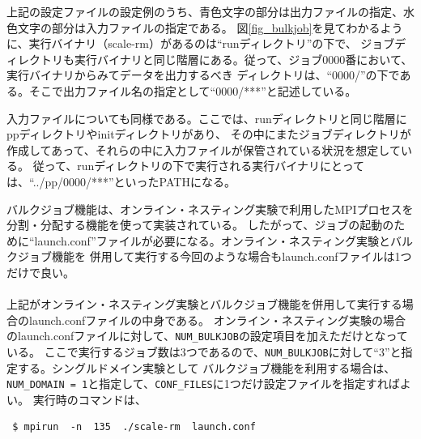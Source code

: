 \noindent 上記の設定ファイルの設定例のうち、青色文字の部分は出力ファイルの指定、水色文字の部分は入力ファイルの指定である。
図\ref{fig_bulkjob}を見てわかるように、実行バイナリ（scale-rm）があるのは``runディレクトリ''の下で、
ジョブディレクトリも実行バイナリと同じ階層にある。従って、ジョブ0000番において、実行バイナリからみてデータを出力するべき
ディレクトリは、``0000/''の下である。そこで出力ファイル名の指定として``0000/***''と記述している。

入力ファイルについても同様である。ここでは、runディレクトリと同じ階層にppディレクトリやinitディレクトリがあり、
その中にまたジョブディレクトリが作成してあって、それらの中に入力ファイルが保管されている状況を想定している。
従って、runディレクトリの下で実行される実行バイナリにとっては、``../pp/0000/***''といったPATHになる。

バルクジョブ機能は、オンライン・ネスティング実験で利用したMPIプロセスを分割・分配する機能を使って実装されている。
したがって、ジョブの起動のために``launch.conf''ファイルが必要になる。オンライン・ネスティング実験とバルクジョブ機能を
併用して実行する今回のような場合もlaunch.confファイルは1つだけで良い。\\

\\

\noindent 上記がオンライン・ネスティング実験とバルクジョブ機能を併用して実行する場合のlaunch.confファイルの中身である。
オンライン・ネスティング実験の場合のlaunch.confファイルに対して、\verb|NUM_BULKJOB|の設定項目を加えただけとなっている。
ここで実行するジョブ数は3つであるので、\verb|NUM_BULKJOB|に対して``3''と指定する。シングルドメイン実験として
バルクジョブ機能を利用する場合は、\verb|NUM_DOMAIN = 1|と指定して、\verb|CONF_FILES|に1つだけ設定ファイルを指定すればよい。
実行時のコマンドは、

\begin{verbatim}
 $ mpirun  -n  135  ./scale-rm  launch.conf
\end{verbatim}

